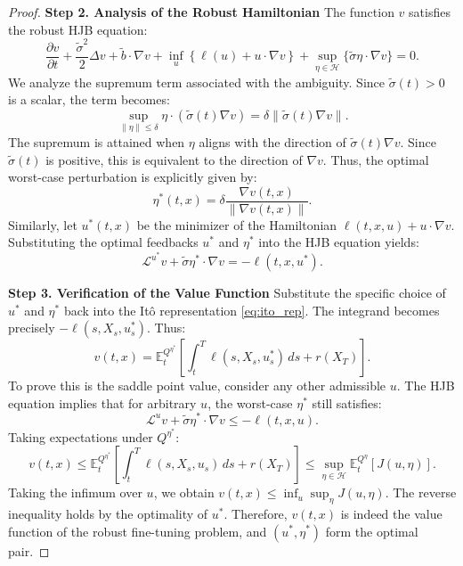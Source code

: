 \documentclass[11pt]{article}
\def\w{\widetilde}
\begin{document}
\begin{proof}
\noindent\textbf{Step 2. Analysis of the Robust Hamiltonian}
The function $v$ satisfies the robust HJB equation:
\begin{equation} \label{eq:robust_hjb_proof}
    \frac{\partial v}{\partial t} + \frac{\w{\sigma}^2}{2} \Delta v + \w b \cdot \nabla v + \inf_{u} \left\{ \ell(u) + u \cdot \nabla v \right\} + \sup_{\eta \in \mathcal{H}} \{ \w{\sigma} \eta \cdot \nabla v \} = 0.
\end{equation}
We analyze the supremum term associated with the ambiguity. Since $\w{\sigma}(t) > 0$ is a scalar, the term becomes:
$$ \sup_{\|\eta\| \le \delta} \eta \cdot (\w{\sigma}(t) \nabla v) = \delta \|\w{\sigma}(t) \nabla v\|. $$
The supremum is attained when $\eta$ aligns with the direction of $\w{\sigma}(t) \nabla v$. Since $\w{\sigma}(t)$ is positive, this is equivalent to the direction of $\nabla v$. Thus, the optimal worst-case perturbation is explicitly given by:
\begin{equation} \label{eq:opt_eta}
    \eta^*(t,x) = \delta \frac{\nabla v(t,x)}{\|\nabla v(t,x)\|}.
\end{equation}
Similarly, let $u^*(t,x)$ be the minimizer of the Hamiltonian $\ell(t,x,u) + u \cdot \nabla v$. Substituting the optimal feedbacks $u^*$ and $\eta^*$ into the HJB equation yields:
$$ \mathcal{L}^{u^*} v + \w{\sigma} \eta^* \cdot \nabla v = -\ell(t, x, u^*). $$

\noindent\textbf{Step 3. Verification of the Value Function}
Substitute the specific choice of $u^*$ and $\eta^*$ back into the Itô representation \eqref{eq:ito_rep}. The integrand becomes precisely $-\ell(s, X_s, u^*_s)$. Thus:
\begin{equation}
    v(t,x) = \mathbb{E}^{Q^{\eta^*}}_{t} \left[ \int_t^T \ell(s, X_s, u^*_s) \, ds + r(X_T) \right].
\end{equation}
To prove this is the saddle point value, consider any other admissible $u$. The HJB equation implies that for arbitrary $u$, the worst-case $\eta^*$ still satisfies:
$$ \mathcal{L}^{u} v + \w{\sigma} \eta^* \cdot \nabla v \le -\ell(t, x, u). $$
Taking expectations under $Q^{\eta^*}$:
$$ v(t,x) \le \mathbb{E}^{Q^{\eta^*}}_{t} \left[ \int_t^T \ell(s, X_s, u_s) \, ds + r(X_T) \right] \le \sup_{\eta \in \mathcal{H}} \mathbb{E}^{Q^{\eta}}_{t} [J(u, \eta)]. $$
Taking the infimum over $u$, we obtain $v(t,x) \le \inf_u \sup_\eta J(u, \eta)$. The reverse inequality holds by the optimality of $u^*$.
Therefore, $v(t,x)$ is indeed the value function of the robust fine-tuning problem, and $(u^*, \eta^*)$ form the optimal pair.
\end{proof}
\end{document}
